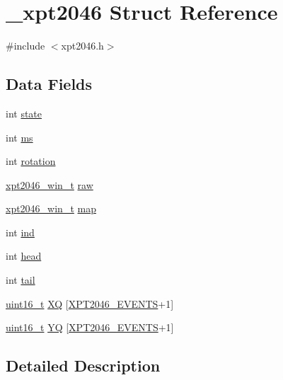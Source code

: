 \hypertarget{struct__xpt2046}{}\section{\+\_\+xpt2046 Struct Reference}
\label{struct__xpt2046}


{\ttfamily \#include $<$xpt2046.\+h$>$}

\subsection*{Data Fields}
\begin{DoxyCompactItemize}
\item 
int \hyperlink{struct__xpt2046_a271e59b1fe899e8d1199f617bd381b15}{state}
\item 
int \hyperlink{struct__xpt2046_a7ada38c703d34310580fbdb4625a5190}{ms}
\item 
int \hyperlink{struct__xpt2046_a9730fbc57085ba0f27bf5563fbbce98b}{rotation}
\item 
\hyperlink{xpt2046_8h_a1e217d8fafba01c2ad20b0986a613316}{xpt2046\+\_\+win\+\_\+t} \hyperlink{struct__xpt2046_a167dbfd40e17aadb4c0edd901db7e118}{raw}
\item 
\hyperlink{xpt2046_8h_a1e217d8fafba01c2ad20b0986a613316}{xpt2046\+\_\+win\+\_\+t} \hyperlink{struct__xpt2046_a851cf6f24189bb94005f00867080a4cd}{map}
\item 
int \hyperlink{struct__xpt2046_ae47d989b6ec543113fc386181ea6d98a}{ind}
\item 
int \hyperlink{struct__xpt2046_a8b4e70a2d7a60543902ac8648c986a31}{head}
\item 
int \hyperlink{struct__xpt2046_a22287733194e6d32116347f39f77523f}{tail}
\item 
\hyperlink{send_8c_a273cf69d639a59973b6019625df33e30}{uint16\+\_\+t} \hyperlink{struct__xpt2046_ac3f7953dda5a05a52276892bee461a29}{XQ} \mbox{[}\hyperlink{xpt2046_8h_abce5dd412f3f040208dab108718fb875}{X\+P\+T2046\+\_\+\+E\+V\+E\+N\+TS}+1\mbox{]}
\item 
\hyperlink{send_8c_a273cf69d639a59973b6019625df33e30}{uint16\+\_\+t} \hyperlink{struct__xpt2046_a0a1b0401066322d653135eb8db55d198}{YQ} \mbox{[}\hyperlink{xpt2046_8h_abce5dd412f3f040208dab108718fb875}{X\+P\+T2046\+\_\+\+E\+V\+E\+N\+TS}+1\mbox{]}
\end{DoxyCompactItemize}


\subsection{Detailed Description}


